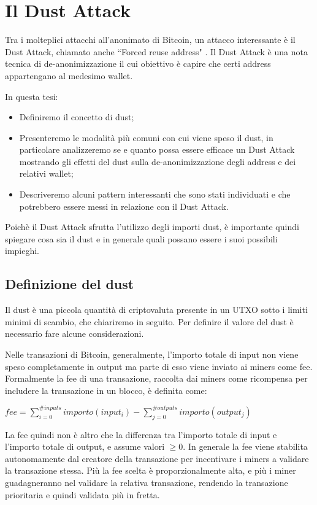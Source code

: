 \chapter{Il Dust Attack}
Tra i molteplici attacchi all'anonimato di Bitcoin, un attacco interessante è il Dust Attack, chiamato anche ``Forced reuse address" \cite{dst_att_def}. Il Dust Attack è una nota tecnica di de-anonimizzazione il cui obiettivo è capire che certi address appartengano al medesimo wallet.

In questa tesi:
\begin{itemize}
\item Definiremo il concetto di dust;
    \item Presenteremo le modalità più comuni con cui viene speso il dust, in particolare analizzeremo se e quanto possa essere efficace un Dust Attack mostrando gli effetti del dust sulla de-anonimizzazione degli address e dei relativi wallet;
    \item Descriveremo alcuni pattern interessanti che sono stati individuati e che potrebbero essere messi in relazione con il  Dust Attack.
\end{itemize}

Poichè il Dust Attack sfrutta l'utilizzo degli importi dust, è importante quindi spiegare cosa sia il dust e in generale quali possano essere i suoi possibili impieghi.

\section{Definizione del dust}
Il dust è una piccola quantità di criptovaluta presente in un UTXO sotto i limiti minimi di scambio, che chiariremo in seguito. Per definire il valore del dust è necessario fare alcune considerazioni.

Nelle transazioni di Bitcoin, generalmente, l'importo totale di input non viene speso completamente in output ma parte di esso viene inviato ai miners come fee. Formalmente la fee di una transazione, raccolta dai miners come ricompensa per includere la transazione in un blocco, è definita come:
\begin{center}
    $fee = \sum_{i=0}^{\#inputs} importo(input_i) - \sum_{j=0}^{\#outputs} importo(output_j)$
\end{center}
La fee quindi non è altro che la differenza tra l'importo totale di input e l'importo totale di output, e assume valori $\ge 0$. In generale la fee viene stabilita autonomamente dal creatore della transazione per incentivare i miners a validare la transazione stessa. Più la fee scelta è proporzionalmente alta, e più i miner guadagneranno nel validare la relativa transazione, rendendo la transazione prioritaria e quindi validata più in fretta.

